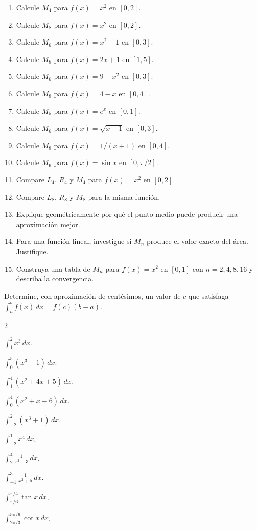 \documentclass[12pt]{article}
\begin{document}
\begin{enumerate}[resume]
\item Calcule $M_4$ para $f(x)=x^2$ en $[0,2]$.
\item Calcule $M_8$ para $f(x)=x^2$ en $[0,2]$.
\item Calcule $M_6$ para $f(x)=x^2+1$ en $[0,3]$.
\item Calcule $M_8$ para $f(x)=2x+1$ en $[1,5]$.
\item Calcule $M_6$ para $f(x)=9-x^2$ en $[0,3]$.
\item Calcule $M_8$ para $f(x)=4-x$ en $[0,4]$.
\item Calcule $M_5$ para $f(x)=e^x$ en $[0,1]$.
\item Calcule $M_6$ para $f(x)=\sqrt{x+1}$ en $[0,3]$.
\item Calcule $M_8$ para $f(x)=1/(x+1)$ en $[0,4]$.
\item Calcule $M_6$ para $f(x)=\sin x$ en $[0,\pi/2]$.
\item Compare $L_4$, $R_4$ y $M_4$ para $f(x)=x^2$ en $[0,2]$.
\item Compare $L_8$, $R_8$ y $M_8$ para la misma función.
\item Explique geométricamente por qué el punto medio puede producir una aproximación mejor.
\item Para una función lineal, investigue si $M_n$ produce el valor exacto del área. Justifique.
\item Construya una tabla de $M_n$ para $f(x)=x^2$ en $[0,1]$ con $n=2,4,8,16$ y describa la convergencia.
\end{enumerate}


Determine, con aproximación de centésimos, un valor de $c$ que satisfaga
$\int_a^b f(x)\,dx=f(c)(b-a).$

\begin{enumerate}[resume]
\begin{multicols}{2}
\item $\displaystyle \int_1^2x^3\,dx$.
\item $\displaystyle \int_0^5(x^3-1)\,dx$.
\item $\displaystyle \int_1^4(x^2+4x+5)\,dx$.
\item $\displaystyle \int_0^4(x^2+x-6)\,dx$.
\item $\displaystyle \int_{-2}^{2}(x^3+1)\,dx$.
\item $\displaystyle \int_{-2}^{1}x^4\,dx$.
\item $\displaystyle \int_2^4\frac{1}{x^2-3}\,dx$.
\item $\displaystyle \int_{-1}^3\frac{1}{x^2+5}\,dx$.
\item $\displaystyle \int_{\pi/6}^{\pi/4}\tan x\,dx$.
\item $\displaystyle \int_{2\pi/3}^{5\pi/6}\cot x\,dx$.
\end{multicols}
\end{enumerate}
\end{document}
